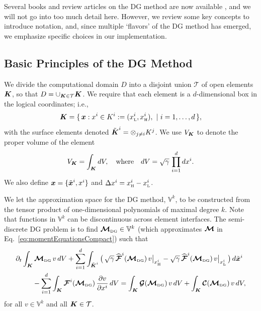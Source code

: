 \documentclass[10pt,preprint]{aastex}
\newcommand{\dx}{\Delta x}
\newcommand{\sumx}{\sum_{i=1}^{d}}
\begin{document}
Several books and review articles on the DG method are now available \citep[see, e.g.,][]{cockburnShu_2001,hesthavenWarburton_2008}, and we will not go into too much detail here.  
However, we review some key concepts to introduce notation, and, since multiple `flavors' of the DG method has emerged, we emphasize specific choices in our implementation.  

\subsection{Basic Principles of the DG Method}

We divide the computational domain $D$ into a disjoint union $\mathcal{T}$ of open elements $\boldsymbol{K}$, so that $D = \cup_{\boldsymbol{K} \in \mathcal{T}}\boldsymbol{K}$.  
We require that each element is a $d$-dimensional box in the logical coordinates; i.e.,
\begin{equation}
  \boldsymbol{K}=\{\,\boldsymbol{x} : x^{i} \in K^{i} := (x_{\mbox{\tiny L}}^{i},x_{\mbox{\tiny H}}^{i}),~|~i=1,\ldots,d\,\}, 
\end{equation}
with the surface elements denoted $\tilde{\boldsymbol{K}}^{i}=\otimes_{j\ne i}K^{j}$.  
We use $V_{\boldsymbol{K}}$ to denote the proper volume of the element
\begin{equation}
  V_{\boldsymbol{K}} = \int_{\boldsymbol{K}}dV, \quad\text{where}\quad dV = \sqrt{\gamma}\,\prod_{i=1}^{d}dx^{i}.  
\end{equation}
We also define $\boldsymbol{x}=\{\tilde{\boldsymbol{x}}^{i},x^{i}\}$ and $\dx^{i}=\xH^{i}-\xL^{i}$.  

We let the approximation space for the DG method, $\mathbb{V}^{k}$, to be constructed from the tensor product of one-dimensional polynomials of maximal degree $k$.  
Note that functions in $\mathbb{V}^{k}$ can be discontinuous across element interfaces.  
The semi-discrete DG problem is to find $\boldsymbol{\mathcal{M}}_{\mbox{\tiny DG}}\in\mathbb{V}^{k}$ (which approximates $\boldsymbol{\mathcal{M}}$ in Eq.~\eqref{eq:momentEquationsCompact}) such that \citep[cf.][]{cockburnShu_2001}
\begin{align}
  &\partial_{t}\int_{\bK}\bcM_{\DG}\,v\,dV
  +\sumx\int_{\tilde{\bK}^{i}}
  \big(\,
    \sqrt{\gamma}\,\widehat{\bcF}^{i}(\bcM_{\DG})\,v\big|_{\xH^{i}}
    -\sqrt{\gamma}\,\widehat{\bcF}^{i}(\bcM_{\DG})\,v\big|_{\xL^{i}}\,\big)\,d\tilde{\bx}^{i} \nonumber \\
  &\hspace{24pt}
  -\sumx\int_{\bK}\bcF^{i}(\bcM_{\DG})\,\pderiv{v}{x^{i}}\,dV
  =\int_{\bK}\bcG(\bcM_{\DG})\,v\,dV+\int_{\bK}\bcC(\bcM_{\DG})\,v\,dV,
  \label{eq:semidiscreteDG}
\end{align}
for all $v\in\mathbb{V}^{k}$ and all $\boldsymbol{K}\in\mathcal{T}$.  
\end{document}
